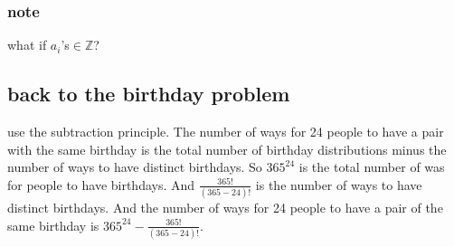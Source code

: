 \documentclass{article}
\begin{document}
\subsubsection*{note}
what if $a_i$'s$\in\mathbb{Z}$?
\subsection*{back to the birthday problem}
use the subtraction principle. The number of ways for 24 people to have a pair with the same birthday is the total number of birthday distributions minus the number of ways to have distinct birthdays. So $365^{24}$ is the total number of was for people to have birthdays. And $\frac{365!}{(365-24)!}$ is the number of ways to have distinct birthdays. And the number of ways for 24 people to have a pair of the same birthday is $365^{24}-\frac{365!}{(365-24)!}$.
\end{document}
